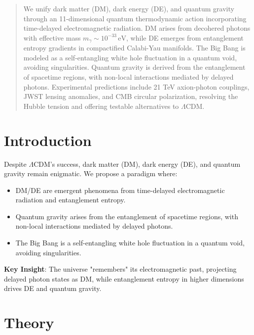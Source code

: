 \documentclass[12pt, a4paper]{article}
\begin{document}
\maketitle

\begin{abstract}
We unify dark matter (DM), dark energy (DE), and quantum gravity through an 11-dimensional quantum thermodynamic action incorporating time-delayed electromagnetic radiation. DM arises from decohered photons with effective mass \( m_\gamma \sim 10^{-33} \, \text{eV} \), while DE emerges from entanglement entropy gradients in compactified Calabi-Yau manifolds. The Big Bang is modeled as a self-entangling white hole fluctuation in a quantum void, avoiding singularities. Quantum gravity is derived from the entanglement of spacetime regions, with non-local interactions mediated by delayed photons. Experimental predictions include 21 TeV axion-photon couplings, JWST lensing anomalies, and CMB circular polarization, resolving the Hubble tension and offering testable alternatives to \(\Lambda\)CDM.
\end{abstract}

\section{Introduction}
\label{sec:intro}
Despite \(\Lambda\)CDM's success, dark matter (DM), dark energy (DE), and quantum gravity remain enigmatic. We propose a paradigm where:
\begin{itemize}
\item DM/DE are emergent phenomena from time-delayed electromagnetic radiation and entanglement entropy.
\item Quantum gravity arises from the entanglement of spacetime regions, with non-local interactions mediated by delayed photons.
\item The Big Bang is a self-entangling white hole fluctuation in a quantum void, avoiding singularities.
\end{itemize}
\textbf{Key Insight}: The universe "remembers" its electromagnetic past, projecting delayed photon states as DM, while entanglement entropy in higher dimensions drives DE and quantum gravity.

\section{Theory}
\label{sec:theory}

\end{document}
